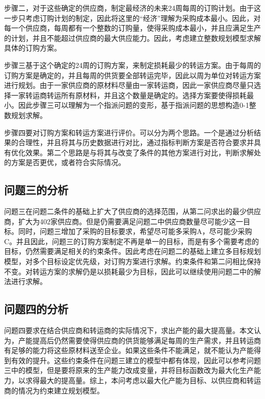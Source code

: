 \documentclass[withoutpreface,bwprint]{cumcmthesis} %
\begin{document}
步骤二，对于这些确定的供应商，制定最经济的未来24周每周的订购计划。由于这一步只考虑订购计划的制定，因此将这里的``经济''理解为采购成本最小。因此，对每一个供应商，每周都有一个整数的订购量，使得采购成本最小，并且应满足生产的计划，并且不能超过供应商的最大供应能力。因此，考虑建立整数规划模型求解具体的订购方案。

步骤三基于这个确定的24周的订购方案，来制定损耗最少的转运方案。由于每周的订购方案是确定的，并且每周的供货要全部转运完毕，因此以周为单位对转运方案进行规划。由于一家供应商的原材料尽量由一家转运商，因此一家供应商尽量只选择一家转运商转运所有原材料，并且这个数量是确定的。选择方案要使得损耗最小。因此步骤三可以理解为一个指派问题的变形，基于指派问题的思想构造0-1整数规划求解。

步骤四要对订购方案和转运方案进行评价。可以分为两个思路。一个是通过分析结果的合理性，并且将其与历史数据进行对比，通过指标判断方案是否符合要求并具有优化效果。第二个思路是与将其与改变了条件的其他方案进行对比，判断求解处的方案是否更优，或者符合实际情况。

\subsection{问题三的分析}

问题三在问题二条件的基础上扩大了供应商的选择范围，从第二问求出的最少供应商，扩大为402家供应商。但是仍需要满足问题二中供应商数量尽可能少这一目标。同时，问题三增加了采购的目标要求，希望尽可能多采购A，尽可能少采购C。并且因此，问题三的订购方案制定不再是单一的目标，而是有多个需要考虑的目标，仍然需要满足相关的约束条件。因此考虑在问题二的基础上建立多目标规划模型，对多个目标设定优先级，对订购方案进行求解。约束条件和第二问相比保持不变。对转运方案的求解仍是以损耗最少为目标，因此可以继续使用问题二中的解法进行求解。


\subsection{问题四的分析}

问题四要求在结合供应商和转运商的实际情况下，求出产能的最大提高量。本文认为，产能提高后仍然需要使得供应商的供货能够满足每周的生产需求，并且转运商有足够的能力将这些原材料送至企业。如果这些条件不能满足，就不能认为产能得到有效的提升。这些约束条件在问题三建立的模型中都有体现，因此可以参考问题三中的模型，但是要将原来的生产能力改成变量，并将目标函数改为最大化生产能力，以求得最大的提高量。综上，本问考虑以最大化产能为目标、以供应商和转运商的情况为约束建立规划模型。
\end{document}
